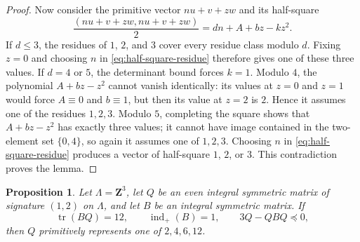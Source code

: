 \documentclass[12pt]{amsart}
\numberwithin{equation}{section}
\newtheorem{proposition}[theorem]{Proposition}
\theoremstyle{definition}
\theoremstyle{remark}
\newcommand{\Z}{\mathbf Z}
\newcommand{\tr}{\operatorname{tr}}
\newcommand{\indp}{\operatorname{ind}_{+}}
\begin{document}
\begin{proof}
Now consider the primitive vector $nu+v+zw$ and its half-square
\begin{equation}\label{eq:half-square-residue}
 \frac{(nu+v+zw, nu+v+zw)}{2}=dn+A+bz-kz^2.
\end{equation}
If $d\leq3$, the residues of $1$, $2$, and $3$ cover every residue
class modulo $d$.  Fixing $z=0$ and choosing $n$ in
\eqref{eq:half-square-residue} therefore gives one of these three
values.  If $d=4$ or $5$, the determinant bound forces $k=1$.
Modulo $4$, the polynomial $A+bz-z^2$ cannot vanish identically: its
values at $z=0$ and $z=1$ would force $A\equiv0$ and $b\equiv1$, but
then its value at $z=2$ is $2$.  Hence it assumes one of the residues
$1,2,3$.  Modulo $5$, completing the square shows that
$A+bz-z^2$ has exactly three values; it cannot have image contained in
the two-element set $\{0,4\}$, so again it assumes one of $1,2,3$.
Choosing $n$ in \eqref{eq:half-square-residue} produces a vector of
half-square $1$, $2$, or $3$.  This contradiction proves the lemma.
\end{proof}

\begin{proposition}\label{prop:rank-three-arithmetic}
Let $\Lambda = \Z^3$, let $Q$ be an even integral symmetric matrix of signature $(1,2)$ on $\Lambda$, and let
$B$ be an integral symmetric matrix.  If
\begin{equation}\label{eq:arithmetic-hypotheses}
 \tr(BQ)=12,\qquad \indp(B)=1,\qquad 3Q-QBQ\preceq0,
\end{equation}
then $Q$ primitively represents one of $2,4,6,12$.
\end{proposition}
\end{document}
